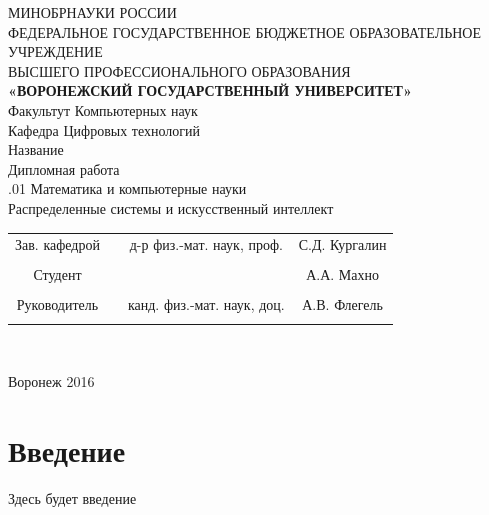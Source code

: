 \documentclass[14pt]{extarticle}
\begin{document}
\begin{center}
	\hfill \break
	\large{МИНОБРНАУКИ РОССИИ}\\
	\footnotesize{ФЕДЕРАЛЬНОЕ ГОСУДАРСТВЕННОЕ БЮДЖЕТНОЕ ОБРАЗОВАТЕЛЬНОЕ УЧРЕЖДЕНИЕ}\\
	\footnotesize{ВЫСШЕГО ПРОФЕССИОНАЛЬНОГО ОБРАЗОВАНИЯ}\\
	\small{\textbf{«ВОРОНЕЖСКИЙ ГОСУДАРСТВЕННЫЙ УНИВЕРСИТЕТ»}}\\
	\hfill \break
	\normalsize{Факультут Компьютерных наук}\\
	\hfill \break
	\normalsize{Кафедра Цифровых технологий}\\
	\hfill\break
	\hfill \break
	\hfill \break
	\hfill \break
	\large{Название}\\
	\hfill \break
	\hfill \break
	\hfill \break
	\normalsize{Дипломная работа\\
		\hfill {}.01 Математика и компьютерные науки\\
		\hfill \break
		Распределенные системы и искусственный интеллект}\\
	\hfill \break
	\hfill \break
\end{center}

\hfill \break
\hfill \break

\normalsize{
	\begin{tabular}{cccc}
		Зав. кафедрой & \underline{\hspace{3cm}} &  д-р физ.-мат. наук,  проф. & С.Д. Кургалин \\\\
		Студент & \underline{\hspace{3cm}} & &А.А. Махно \\\\
		Руководитель & \underline{\hspace{3cm}}& канд. физ.-мат. наук, доц. &  А.В. Флегель \\\\
	\end{tabular}
}\\
\hfill \break
\hfill \break
\begin{center} Воронеж 2016 \end{center}
\thispagestyle{empty} %

\newpage	
\tableofcontents
\thispagestyle{empty} %
\newpage	
\section*{Введение}
Здесь будет введение
\newpage
\end{document}

